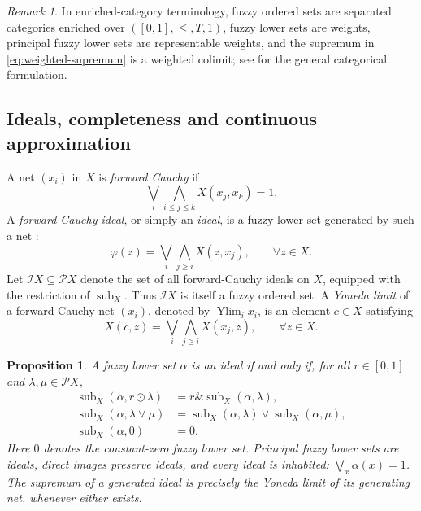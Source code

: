 \documentclass[preprint,3p,times]{elsarticle}
\newtheorem{proposition}[proposition]{Proposition}
\theoremstyle{definition}
\theoremstyle{remark}
\newtheorem{remark}[remark]{Remark}
\newcommand{\I}{\mathcal{I}}
\newcommand{\Psh}{\mathcal{P}}
\newcommand{\Ylim}{\operatorname{Ylim}}
\newcommand{\subdeg}{\operatorname{sub}}
\newcommand{\tn}{\mathbin{\&}}
\numberwithin{equation}{section}
\begin{document}
\begin{remark}
In enriched-category terminology, fuzzy ordered sets are separated categories enriched over \(([0,1],\leq,T,1)\), fuzzy lower sets are weights, principal fuzzy lower sets are representable weights, and the supremum in \eqref{eq:weighted-supremum} is a weighted colimit; see \cite{LaiZhang2007,Zhang2024} for the general categorical formulation.
\end{remark}

\subsection{Ideals, completeness and continuous approximation}
A net \((x_i)\) in \(X\) is \emph{forward Cauchy} \cite[Definition~9.1]{Zhang2024} if
\begin{equation}\label{eq:forward-cauchy}
 \bigvee_i\bigwedge_{i\leq j\leq k}X(x_j,x_k)=1.
\end{equation}
A \emph{forward-Cauchy ideal}, or simply an \emph{ideal}, is a fuzzy lower set generated by such a net \cite[Section~3]{LaiZhangZhang2020}:
\begin{equation}\label{eq:generated-weight}
 \varphi(z)=\bigvee_i\bigwedge_{j\geq i}X(z,x_j),\qquad \forall z\in X.
\end{equation}
Let \(\I X\subseteq\Psh X\) denote the set of all forward-Cauchy ideals on \(X\), equipped with the restriction of \(\subdeg_X\). Thus \(\I X\) is itself a fuzzy ordered set.
A \emph{Yoneda limit} of a forward-Cauchy net \((x_i)\), denoted by \(\Ylim_i x_i\), is an element \(c\in X\) satisfying 
\begin{equation}\label{eq:yoneda-limit}
 X(c,z)=\bigvee_i\bigwedge_{j\geq i}X(x_j,z),
 \qquad \forall z\in X.
\end{equation}

\begin{proposition}\cite[Definition~9.9, Theorem~9.10, Lemma~9.11 and Proposition~9.13]{Zhang2024}\label{prop:forward-cauchy-representation}
A fuzzy lower set \(\alpha\) is an ideal if and only if, for all \(r\in[0,1]\) and \(\lambda,\mu\in\Psh X\),
\begin{equation}\label{eq:canonical-laws}
\begin{aligned}
 \subdeg_X(\alpha,r\odot\lambda)
 &=r\tn\subdeg_X(\alpha,\lambda),\\
 \subdeg_X(\alpha,\lambda\vee\mu)
 &=\subdeg_X(\alpha,\lambda)\vee\subdeg_X(\alpha,\mu),\\
 \subdeg_X(\alpha,0)&=0.
\end{aligned}
\end{equation}
Here \(0\) denotes the constant-zero fuzzy lower set. Principal fuzzy lower sets are ideals, direct images preserve ideals, and every ideal is inhabited: \(\bigvee_x\alpha(x)=1\). The supremum of a generated ideal is precisely the Yoneda limit of its generating net, whenever either exists.
\end{proposition}
\end{document}
